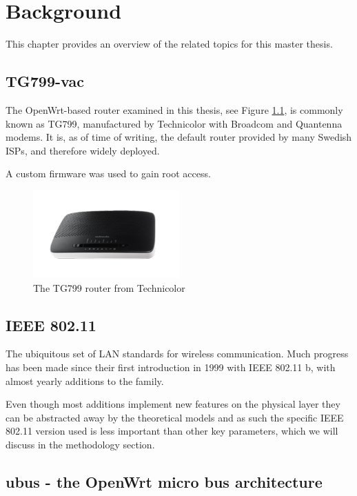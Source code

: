 \chapter{Background}

This chapter provides an overview of the related topics for this master thesis.

\section{TG799-vac}

The OpenWrt-based router examined in this thesis, see Figure \ref{fig:tg799}, is
commonly known as TG799, manufactured by Technicolor with Broadcom and Quantenna
modems. It is, as of time of writing, the default router provided by many
Swedish ISPs, and therefore widely deployed.

A custom firmware was used to gain root access.

\begin{figure}
\center
\includegraphics[width=0.5\textwidth]{images/tg799.png}
\caption{The TG799 router from Technicolor}
\label{fig:tg799}
\end{figure}

\section{IEEE 802.11}

The ubiquitous set of LAN standards for wireless communication. Much progress
has been made since their first introduction in 1999 with IEEE 802.11 b, with
almost yearly additions to the family.

Even though most additions implement new features on the physical layer they can
be abstracted away by the theoretical models and as such the specific IEEE
802.11 version used is less important than other key parameters, which we will
discuss in the methodology section.

\section{ubus - the OpenWrt micro bus architecture}

